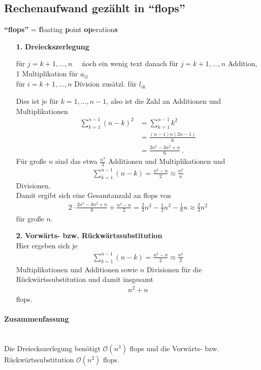 \documentclass[ngerman,fontsize=11pt, paper=a4, parskip=half, titlepage=true, toc=bib]{scrbook}
\theoremstyle{definition}
\theoremstyle{plain}
\newcommand{\subsectione}[1]{\addtocounter{Def}{1}\subsection{#1}}
\begin{document}
\subsectione{Rechenaufwand gezählt in \enquote{flops}} 
\textbf{\enquote{flops} }= \textbf{f}loating \textbf{p}oint \textbf{op}eration\textbf{s} \\
\begin{enumerate}
\item[\textbf{1.}] \textbf{Dreieckszerlegung} 
  \begin{tabbing}
    für $j=k+1, \dots, n\quad$ \= noch ein wenig text danach \kill
    für $j=k+1, \dots, n$  Addition, 1 Multiplikation für $a_{ij}$ \\
    für $i=k+1, \dots, n$  Division zusätzl. für $ l_{ik}$
  \end{tabbing}
  Dies ist je für $k=1, \dots, n-1$, also ist die Zahl an Additionen und Multiplikationen
  \begin{align*}
    \sum_{k=1}^{n-1}(n-k)^2 &= \sum_{k=1}^{n-1}k^2 \\
                            &= \frac{(n-1)n(2n-1)}{6} \\
                            &= \frac{2n^3-3n^2+n}{6}\, .
  \end{align*}
  Für große $n$ sind das etwa $\frac{n^3}{3}$ Additionen und Multiplikationen und
  \begin{gather*}
    \sum_{k=1}^{n-1} (n-k) = \frac{n^2-n}{2} \approx \frac{n^2}{n}
  \end{gather*}
  Divisionen. \\
  Damit ergibt sich eine Gesamtanzahl an flops von
  \begin{gather*}
    2\cdot\frac{2n^3-3n^2+n}{6} + \frac{n^2-n}{2} 
    = \frac{2}{3} n^3 - \frac{1}{2}n^2 - \frac{1}{6} n
    \approx \frac{2}{3}n^2
  \end{gather*}
  für große $n$.
  
\item[\textbf{2.}] \textbf{Vorwärts- bzw. Rückwärtssubstitution}  \\
  Hier ergeben sich je
  \begin{gather*}
    \sum_{k=1}^{n-1} (n-k) = \frac{n^2-n}{2} \approx \frac{n^2}{2}
  \end{gather*}
  Multiplikationen und Additionen sowie 
  $n$ Divisionen für die Rückwärtssubstitution und damit insgesamt \begin{gather*}n^2+n\end{gather*} flops.	
\end{enumerate}
\paragraph{Zusammenfassung}~ \\
Die Dreieckszerlegung benötigt $\mathcal{O}(n^3)$ flops und 
die Vorwärts- bzw. Rückwärtssubstitution $\mathcal{O}(n^2)$ flops.
\end{document}
